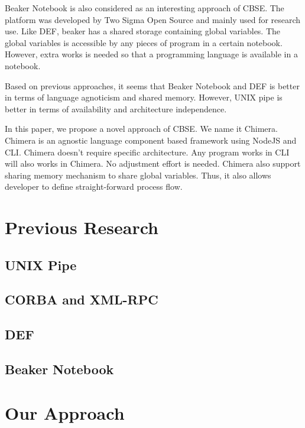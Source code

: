 \documentclass[conference]{IEEEtran}
\begin{document}
Beaker Notebook \cite{beakernotebook} is also considered as an interesting 
approach of CBSE. The platform was developed by Two Sigma Open Source and 
mainly used for research use. Like DEF, beaker has a shared storage containing 
global variables. The global variables is accessible by any pieces of program 
in a certain notebook. However, extra works is needed so that a programming 
language is available in a notebook.

Based on previous approaches, it seems that Beaker Notebook and DEF is better 
in terms of language agnoticism and shared memory. However, UNIX pipe is 
better in terms of availability and architecture independence.

In this paper, we propose a novel approach of CBSE. We name it Chimera. 
Chimera is an agnostic language component based framework using NodeJS and 
CLI. Chimera doesn't require specific architecture. Any program works in CLI 
will also works in Chimera. No adjustment effort is needed. Chimera also 
support sharing memory mechanism to share global variables. Thus, it also 
allows developer to define straight-forward process flow.

\section{Previous Research}
\blindtext

\subsection{UNIX Pipe}
\blindtext

\subsection{CORBA and XML-RPC}
\blindtext

\subsection{DEF}
\blindtext

\subsection{Beaker Notebook}
\blindtext

\section{Our Approach}
\blindtext
\end{document}
